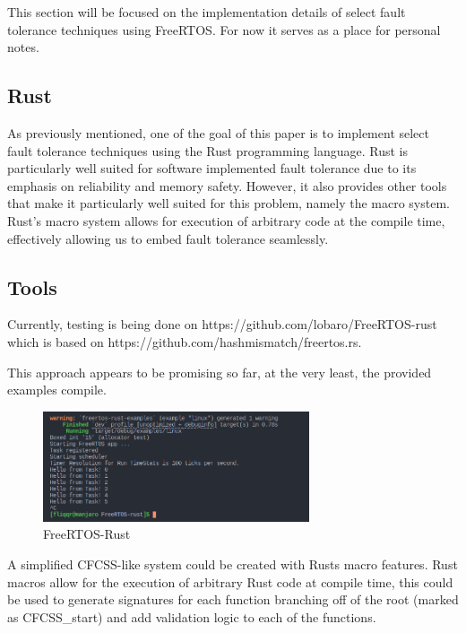 \documentclass[12pt, letterpaper]{article}
\begin{document}
This section will be focused on the implementation details of select fault tolerance techniques using FreeRTOS. For now it serves as a place for personal notes.

\subsection{Rust}

As previously mentioned, one of the goal of this paper is to implement select fault tolerance techniques using the Rust programming language. Rust is particularly well suited for software implemented fault tolerance due to its emphasis on reliability and memory safety. However, it also provides other tools that make it particularly well suited for this problem, namely the macro system. Rust's macro system allows for execution of arbitrary code at the compile time, effectively allowing us to embed fault tolerance seamlessly.

\subsection{Tools}

Currently, testing is being done on https://github.com/lobaro/FreeRTOS-rust which is based on https://github.com/hashmismatch/freertos.rs.

This approach appears to be promising so far, at the very least, the provided examples compile.
\begin{figure}[hbt]
    \centering
    \includegraphics[width=0.7\textwidth]{diagrams/screenshots/freertos-rust-example.png}
    \caption{FreeRTOS-Rust}
    \label{fig:freertos-rust}
\end{figure}

A simplified CFCSS-like system could be created with Rusts macro features. Rust macros allow for the execution of arbitrary Rust code at compile time, this could be used to generate signatures for each function branching off of the root (marked as CFCSS\_start) and add validation logic to each of the functions.
\end{document}
